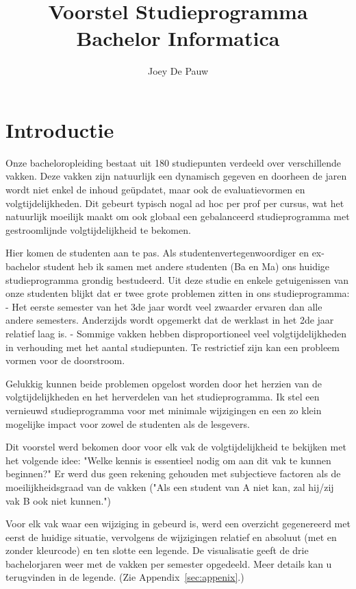 \documentclass[a4paper]{article}
\title{Voorstel Studieprogramma Bachelor Informatica}
\author{Joey De Pauw}
\date{}
\begin{document}
    \maketitle

    \section{Introductie}

        Onze bacheloropleiding bestaat uit 180 studiepunten verdeeld over verschillende vakken. Deze vakken zijn natuurlijk een dynamisch gegeven en doorheen de jaren wordt niet enkel de inhoud ge\"updatet, maar ook de evaluatievormen en volgtijdelijkheden. Dit gebeurt typisch nogal ad hoc per prof per cursus, wat het natuurlijk moeilijk maakt om ook globaal een gebalanceerd studieprogramma met gestroomlijnde volgtijdelijkheid te bekomen.

        Hier komen de studenten aan te pas. Als studentenvertegenwoordiger en ex-bachelor student heb ik samen met andere studenten (Ba en Ma) ons huidige studieprogramma grondig bestudeerd. Uit deze studie en enkele getuigenissen van onze studenten blijkt dat er twee grote problemen zitten in ons studieprogramma:
            - Het eerste semester van het 3de jaar wordt veel zwaarder ervaren dan alle andere semesters. Anderzijds wordt opgemerkt dat de werklast in het 2de jaar relatief laag is.
            - Sommige vakken hebben disproportioneel veel volgtijdelijkheden in verhouding met het aantal studiepunten. Te restrictief zijn kan een probleem vormen voor de doorstroom.

        Gelukkig kunnen beide problemen opgelost worden door het herzien van de volgtijdelijkheden en het herverdelen van het studieprogramma. Ik stel een vernieuwd studieprogramma voor met minimale wijzigingen en een zo klein mogelijke impact voor zowel de studenten als de lesgevers.

        Dit voorstel werd bekomen door voor elk vak de volgtijdelijkheid te bekijken met het volgende idee: "Welke kennis is essentieel nodig om aan dit vak te kunnen beginnen?" Er werd dus geen rekening gehouden met subjectieve factoren als de moeilijkheidsgraad van de vakken ("Als een student van A niet kan, zal hij/zij vak B ook niet kunnen.")

        Voor elk vak waar een wijziging in gebeurd is, werd een overzicht gegenereerd met eerst de huidige situatie, vervolgens de wijzigingen relatief en absoluut (met en zonder kleurcode) en ten slotte een legende. De visualisatie geeft de drie bachelorjaren weer met de vakken per semester opgedeeld. Meer details kan u terugvinden in de legende. (Zie Appendix~\ref{sec:appenix}.)
\end{document}

